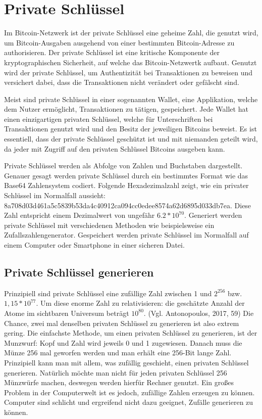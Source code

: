 \section{Private Schlüssel}
Im Bitcoin-Netzwerk ist der private Schlüssel eine geheime Zahl, die genutzt wird, um Bitcoin-Ausgaben ausgehend von einer 
bestimmten Bitcoin-Adresse zu authorisieren. Der private Schlüssel ist eine kritische Komponente der kryptographischen Sicherheit,
auf welche das Bitcoin-Netzwertk aufbaut. Genutzt wird der private Schlüssel, um Authentizität bei Transaktionen zu beweisen und
versichert dabei, dass die Transaktionen nicht verändert oder gefälscht sind.

Meist sind private Schlüssel in einer sogenannten Wallet, eine Applikation, welche dem Nutzer ermöglicht, Transaktionen zu tätigen,
gespeichert. Jede Wallet hat einen einzigartigen privaten Schlüssel, welche für Unterschriften bei Transaktionen genutzt wird und
den Besitz der jeweiligen Bitcoins beweist. Es ist essentiell, dass der private Schlüssel geschützt ist und mit niemanden geteilt
wird, da jeder mit Zugriff auf den privaten Schlüssel Bitcoins ausgeben kann.

Private Schlüssel werden als Abfolge von Zahlen und Buchstaben dargestellt. Genauer gesagt werden private Schlüssel durch ein
bestimmtes Format wie das Base64 Zahlensystem codiert. Folgende Hexadezimalzahl zeigt, wie ein privater Schlüssel im 
Normalfall aussieht: 8a708d03d461a5c5839b53da4c40912ca094cc0edee8574a62d6895d033db7ea. Diese Zahl entspricht einem Dezimalwert 
von ungefähr \( 6.2 * 10^{70} \). Generiert werden private Schlüssel mit verschiedenen Methoden wie beispielsweise ein 
Zufallszahlengenerator. Gespeichert werden private Schlüssel im Normalfall auf einem Computer oder Smartphone in einer sicheren 
Datei.

\subsection{Private Schlüssel generieren}
Prinzipiell sind private Schlüssel eine zufällige Zahl zwischen 1 und \( 2^{256} \) bzw. \( 1,15 * 10^{77} \). Um diese enorme Zahl
zu relativisieren: die geschätzte Anzahl der Atome im sichtbaren Universum beträgt \( 10^{80} \). (Vgl. Antonopoulos, 2017, 59) Die Chance,
zwei mal denselben privaten Schlüssel zu generieren ist also extrem gering. Die einfachste Methode, um einen privaten Schlüssel
zu generieren, ist der Munzwurf: Kopf und Zahl wird jeweils 0 und 1 zugewiesen. Danach muss die Münze 256 mal geworfen werden
und man erhält eine 256-Bit lange Zahl. Prinzipiell kann man mit allem, was zufällig geschieht, einen privaten Schlüssel generieren.
Natürlich möchte man nicht für jeden privaten Schlüssel 256 Münzwürfe machen, deswegen werden hierfür Rechner genutzt. Ein großes
Problem in der Computerwelt ist es jedoch, zufällige Zahlen erzeugen zu können. Computer sind schlicht und ergreifend nicht dazu 
geeignet, Zufälle generieren zu können.

